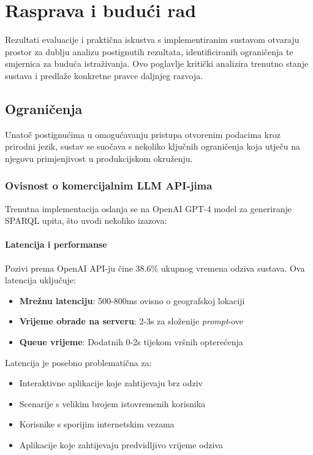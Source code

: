 \chapter{Rasprava i budući rad}
\label{ch:discussion_future_work}


Rezultati evaluacije i praktična iskustva s implementiranim sustavom otvaraju prostor za dublju analizu postignutih rezultata, identificiranih ograničenja te smjernica za buduća istraživanja. Ovo poglavlje kritički analizira trenutno stanje sustava i predlaže konkretne pravce daljnjeg razvoja.

\section{Ograničenja}

Unatoč postignućima u omogućavanju pristupa otvorenim podacima kroz prirodni jezik, sustav se suočava s nekoliko ključnih ograničenja koja utječu na njegovu primjenjivost u produkcijskom okruženju.

\subsection{Ovisnost o komercijalnim LLM API-jima}

Trenutna implementacija oslanja se na OpenAI GPT-4 model za generiranje SPARQL upita, što uvodi nekoliko izazova:

\subsubsection{Latencija i performanse}

Pozivi prema OpenAI API-ju čine 38.6\% ukupnog vremena odziva sustava. Ova latencija uključuje:

\begin{itemize}
    \item \textbf{Mrežnu latenciju}: 500-800ms ovisno o geografskoj lokaciji
    \item \textbf{Vrijeme obrade na serveru}: 2-3s za složenije \textit{prompt}-ove
    \item \textbf{Queue vrijeme}: Dodatnih 0-2s tijekom vršnih opterećenja
\end{itemize}

Latencija je posebno problematična za:
\begin{itemize}
    \item Interaktivne aplikacije koje zahtijevaju brz odziv
    \item Scenarije s velikim brojem istovremenih korisnika
    \item Korisnike s sporijim internetskim vezama
    \item Aplikacije koje zahtijevaju predvidljivo vrijeme odziva
\end{itemize}

